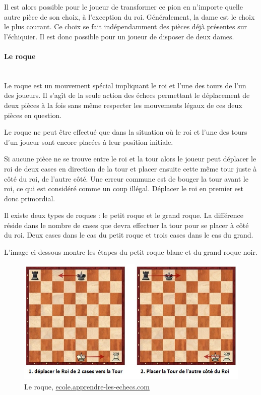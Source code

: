 \documentclass{article}
\begin{document}
Il est alors possible pour le joueur de transformer ce pion en n'importe quelle autre pièce de son choix, à l'exception du roi. Généralement, la dame est le choix le plus courant. Ce choix se fait indépendamment des pièces déjà présentes sur l'échiquier. Il est donc possible pour un joueur de disposer de deux dames.

\paragraph{Le roque}
~~\\

Le roque est un mouvement spécial impliquant le roi et l'une des tours de l'un des joueurs. Il s'agît de la seule action des échecs permettant le déplacement de deux pièces à la fois sans même respecter les mouvements légaux de ces deux pièces en question.

Le roque ne peut être effectué que dans la situation où le roi et l'une des tours d'un joueur sont encore placées à leur position initiale.

Si aucune pièce ne se trouve entre le roi et la tour alors le joueur peut déplacer le roi de deux cases en direction de la tour et placer ensuite cette même tour juste à côté du roi, de l'autre côté. Une erreur commune est de bouger la tour avant le roi, ce qui est considéré comme un coup illégal. Déplacer le roi en premier est donc primordial.

Il existe deux types de roques : le petit roque et le grand roque. La différence réside dans le nombre de cases que devra effectuer la tour pour se placer à côté du roi. Deux cases dans le cas du petit roque et trois cases dans le cas du grand.

L'image ci-dessous montre les étapes du petit roque blanc et du grand roque noir.

\begin{figure}[h]
\centering
\includegraphics[scale=0.8]{img/roque.jpg}
\caption{Le roque,
\href{https://ecole.apprendre-les-echecs.com/roque/}{ecole.apprendre-les-echecs.com}}
\end{figure}
\end{document}
